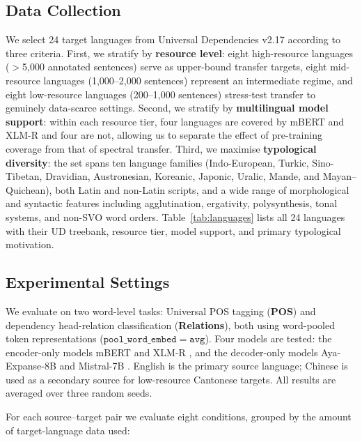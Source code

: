 \subsection{Data Collection}

We select 24 target languages from Universal Dependencies v2.17
\citep{UD} according to three criteria.
First, we stratify by \textbf{resource level}: eight high-resource
languages ({$>$}5{,}000 annotated sentences) serve as upper-bound
transfer targets, eight mid-resource languages (1{,}000--2{,}000
sentences) represent an intermediate regime, and eight low-resource
languages (200--1{,}000 sentences) stress-test transfer to genuinely
data-scarce settings.
Second, we stratify by \textbf{multilingual model support}: within
each resource tier, four languages are covered by mBERT and XLM-R
and four are not, allowing us to separate the effect of pre-training
coverage from that of spectral transfer.
Third, we maximise \textbf{typological diversity}: the set spans ten
language families (Indo-European, Turkic, Sino-Tibetan, Dravidian,
Austronesian, Koreanic, Japonic, Uralic, Mande, and Mayan--Quichean),
both Latin and non-Latin scripts, and a wide range of morphological
and syntactic features including agglutination, ergativity,
polysynthesis, tonal systems, and non-SVO word orders.
Table~\ref{tab:languages} lists all 24 languages with their UD
treebank, resource tier, model support, and primary typological
motivation.

\subsection{Experimental Settings}

We evaluate on two word-level tasks: Universal POS tagging
(\textbf{POS}) and dependency head-relation classification
(\textbf{Relations}), both using word-pooled token representations
($\mathtt{pool\_word\_embed{=}avg}$).
Four models are tested: the encoder-only models mBERT
\citep{devlin-etal-2019-bert} and XLM-R \citep{conneau-etal-2020-unsupervised},
and the decoder-only models Aya-Expanse-8B
\citep{aryabumi-etal-2024-aya} and Mistral-7B \citep{jiang2023mistral}.
English is the primary source language; Chinese is used as a secondary
source for low-resource Cantonese targets.
All results are averaged over three random seeds.

For each source--target pair we evaluate eight conditions,
grouped by the amount of target-language data used:

